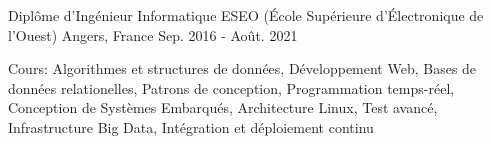 

\begin{cventries}

  \cventry
    {Diplôme d'Ingénieur Informatique} %
    {ESEO (École Supérieure d'Électronique de l'Ouest)} %
    {Angers, France} %
    {Sep. 2016 - Août. 2021} %
    {
      \begin{cvitems} %
        \item {Cours: Algorithmes et structures de données, Développement Web, Bases de données relationelles, Patrons de conception, Programmation temps-réel, Conception de Systèmes Embarqués, Architecture Linux, Test avancé, Infrastructure Big Data, Intégration et déploiement continu}
      \end{cvitems}
    }

\end{cventries}
